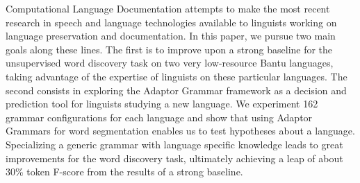 Computational Language Documentation attempts to make the most recent research in speech and language technologies available to linguists working on language preservation and documentation. In this paper, we pursue two main goals along these lines. The first is to improve upon a strong baseline for the unsupervised word discovery task on two very low-resource Bantu languages, taking advantage of the expertise of linguists on these particular languages. The second consists in exploring the Adaptor Grammar framework as a decision and prediction tool for linguists studying a new language. We experiment 162 grammar configurations for each language and show that using Adaptor Grammars for word segmentation enables us to test hypotheses about a language. Specializing a generic grammar with language specific knowledge leads to great improvements for the word discovery task, ultimately achieving a leap of about 30\% token F-score from the results of a strong baseline.
